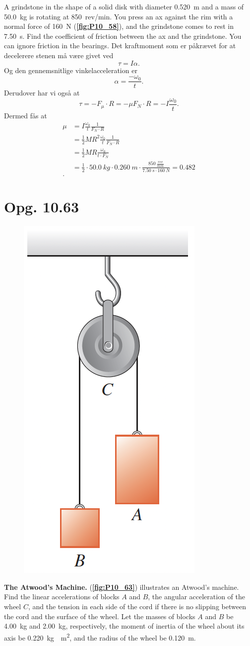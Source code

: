 \documentclass[12pt]{article}
\begin{document}
A grindstone in the shape of a solid disk with diameter \qty{0,520}{m} and a mass of \qty{50,0}{kg} is rotating at \qty{850}{rev/min}. You press an ax against the rim with a normal force of \qty{160}{N} (\textbf{\autoref{fig:P10_58}}), and the grindstone comes to rest in \qty{7,50}{s}. Find the coefficient of friction between the ax and the grindstone. You can ignore friction in the bearings.
\bigbreak
Det kraftmoment som er påkrævet for at decelerere stenen må være givet ved
\[
\tau = I\alpha
.\] 
Og den gennemsnitlige vinkelacceleration er 
\[
\alpha = \frac{-\omega_0}{t}
.\] 
Derudover har vi også at
\[
\tau = -F_{\mu}\cdot R = - \mu F_N\cdot R  = -I \frac{\omega_0}{t}
.\] 
Dermed fås at
\begin{align*}
  \mu &= I \frac{\omega_0}{t} \frac{1}{F_N\cdot R} \\
  &= \frac{1}{2}MR^2 \frac{\omega_0}{t} \frac{1}{F_N\cdot R} \\
  &= \frac{1}{2}MR \frac{\omega_0}{t\cdot F_N} \\
  &= \frac{1}{2}\cdot \qty{50,0}{kg}\cdot \qty{0,260}{m} \cdot  \frac{\qty{850}{\frac{rev}{min}}}{\qty{7,50}{s}\cdot \qty{160}{N}} = \num{0,482} \\
.\end{align*}

\section*{Opg. 10.63}
\begin{figure} [ht]
  \centering
  \caption{}
  \includegraphics[width=0.15\linewidth]{../figures/P10_63.png}
  \label{fig:P10_63}
\end{figure}

\textbf{The Atwood’s Machine.} (\textbf{\autoref{fig:P10_63}}) illustrates an Atwood’s machine. Find the linear accelerations of blocks $A$ and $B$, the angular acceleration of the wheel $C$, and the tension in each side of the cord if there is no slipping between the cord and the surface of the wheel. Let the masses of blocks $A$ and $B$ be \qty{4,00}{kg} and \qty{2,00}{kg}, respectively, the moment of inertia of the wheel about its axis be \qty{0,220}{kg\cdot m^2}, and the radius of the wheel be \qty{0,120}{m}.
\end{document}
